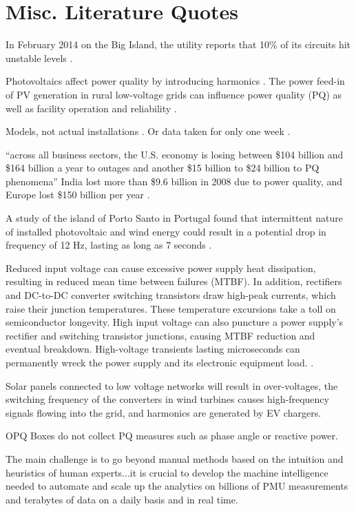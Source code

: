 \section{Misc. Literature Quotes}

In February 2014 on the Big Island, the utility reports that 10\% of its circuits hit unstable levels \cite{trabish_solar_2014}.

Photovoltaics affect power quality by introducing harmonics \cite{anurangi_effects_2017}. The power feed-in of PV generation in rural low-voltage grids can influence power quality (PQ) as well as facility operation and reliability \cite{rita_pinto_impact_2016}.

Models, not actual installations \cite{anurangi_effects_2017,bayindir_effects_2016,farhoodnea_power_2012,shafiullah_experimental_2014}. Or data taken for only one week \cite{kucuk_assessment_2013}.

``across all business sectors, the U.S. economy is losing between \$104 billion and \$164 billion a year to outages and another \$15 billion to \$24 billion to PQ phenomena'' \cite{elphick_summary_2015} India lost more than \$9.6 billion in 2008 due to power quality, and Europe lost \$150 billion per year \cite{laskar_power_2012}.

A study of the island of Porto Santo in Portugal found that intermittent nature of installed photovoltaic and wind energy could result in a potential drop in frequency of 12 Hz, lasting as long as 7 seconds \cite{delgado_solutions_2011}.

Reduced input voltage can cause excessive power supply heat dissipation, resulting in reduced mean time between failures (MTBF). In addition, rectifiers and DC-to-DC converter switching transistors draw high-peak currents, which raise their junction temperatures. These temperature excursions take a toll on semiconductor longevity. High input voltage can also puncture a power supply's rectifier and switching transistor junctions, causing MTBF reduction and eventual breakdown. High-voltage transients lasting microseconds can permanently wreck the power supply and its electronic equipment load. \cite{dedad_when_2008}.

Solar panels connected to low voltage networks will result in over-voltages, the switching frequency of the converters in wind turbines causes high-frequency signals flowing into the grid, and harmonics are generated by EV chargers. \cite{zavoda_power_2018}

OPQ Boxes do not collect PQ measures such as phase angle or reactive power.

The main challenge is to go beyond manual methods based on the intuition and heuristics of human experts...it is crucial to develop the machine intelligence needed to automate and scale up the analytics on billions of PMU measurements and terabytes of data on a daily basis and in real time. \cite{mohsenian-rad_distribution_2018}

